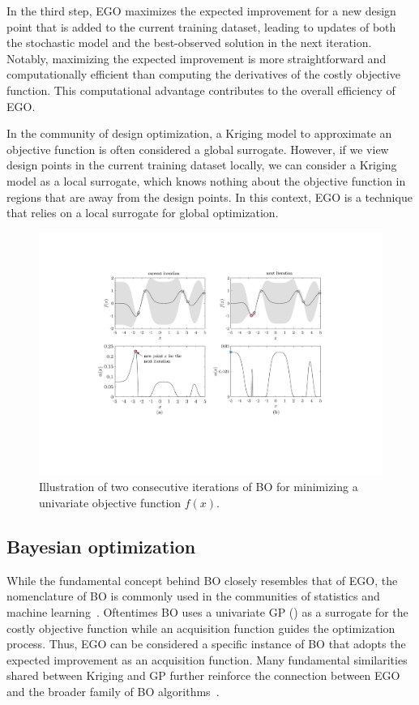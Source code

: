 \documentclass[journal ]{new-aiaa}
\begin{document}
	In the third step, EGO maximizes the expected improvement for a new design point that is added to the current training dataset, leading to updates of both the stochastic model and the best-observed solution in the next iteration.
	Notably, maximizing the expected improvement is more straightforward and computationally efficient than computing the derivatives of the costly objective function.
	This computational advantage contributes to the overall efficiency of EGO.
	
	In the community of design optimization, a Kriging model to approximate an objective function is often considered a global surrogate.
	However, if we view design points in the current training dataset locally, we can consider a Kriging model as a local surrogate, which knows nothing about the objective function in regions that are away from the design points.
	In this context, EGO is a technique that relies on a local surrogate for global optimization.  
	
	\begin{figure}
		\centering
		\includegraphics[scale=0.82]{Fig5.pdf}
		\caption{ Illustration of two consecutive iterations of BO for minimizing a univariate objective function $f(x)$.}
		\label{Fig-5}
	\end{figure}
	
	\subsection{Bayesian optimization}\label{Sec32}
	
	While the fundamental concept behind BO closely resembles that of EGO, the nomenclature of BO is commonly used in the communities of statistics and machine learning~\citep{Bull2011,Snoek2012,Shahriari2016,Frazier2018}.
	Oftentimes BO uses a univariate GP () as a surrogate for the costly objective function while an acquisition function guides the optimization process. 
	Thus, EGO can be considered a specific instance of BO that adopts the expected improvement as an acquisition function.
	Many fundamental similarities shared between Kriging and GP further reinforce the connection between EGO and the broader family of BO algorithms~\citep{Christianson2023}.
	
\end{document}
